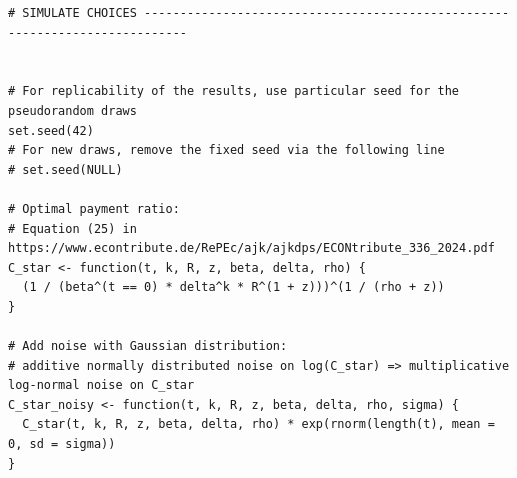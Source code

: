 \documentclass[11pt, a4paper, oneside]{article}
\theoremstyle{Plain}
\theoremstyle{Definition}
\theoremstyle{Remark}
\begin{document}
\begin{appendix}
\begin{lstlisting}
# SIMULATE CHOICES ----------------------------------------------------------------------------


# For replicability of the results, use particular seed for the pseudorandom draws
set.seed(42)
# For new draws, remove the fixed seed via the following line
# set.seed(NULL)

# Optimal payment ratio:
# Equation (25) in https://www.econtribute.de/RePEc/ajk/ajkdps/ECONtribute_336_2024.pdf
C_star <- function(t, k, R, z, beta, delta, rho) {
  (1 / (beta^(t == 0) * delta^k * R^(1 + z)))^(1 / (rho + z))
}

# Add noise with Gaussian distribution:
# additive normally distributed noise on log(C_star) => multiplicative log-normal noise on C_star
C_star_noisy <- function(t, k, R, z, beta, delta, rho, sigma) {
  C_star(t, k, R, z, beta, delta, rho) * exp(rnorm(length(t), mean = 0, sd = sigma))
}


\end{lstlisting}
\end{appendix}
\end{document}
